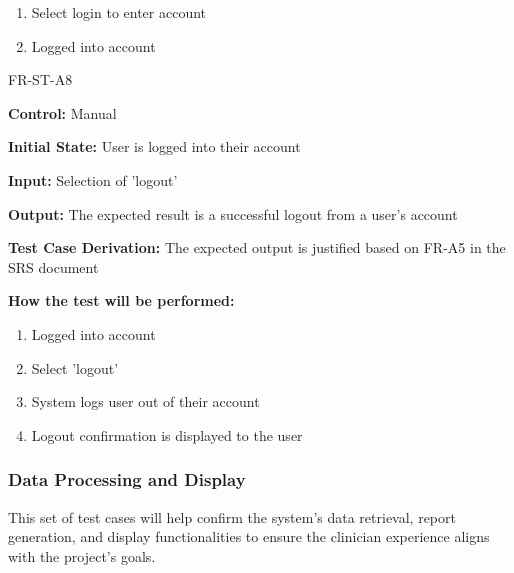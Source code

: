 \documentclass[12pt, titlepage]{article}
\begin{document}
\begin{itemize}
\begin{item}
\begin{mdframed}[linewidth=0.5mm]
\begin{enumerate}[noitemsep]
      \item Select login to enter account
      \item Logged into account
    \end{enumerate}
\end{mdframed}
\end{item}
\begin{item}
  FR-ST-A8
  \begin{mdframed}[linewidth=0.5mm]
    \textbf{Control:} Manual \par
    \textbf{Initial State:} User is logged into their account \par
    \textbf{Input:} Selection of 'logout' \par
    \textbf{Output:} The expected result is a successful logout from a user's account \par
    \textbf{Test Case Derivation:} The expected output is justified based on FR-A5 in the SRS document \par
    \textbf{How the test will be performed:}
    \begin{enumerate}[noitemsep]
      \item Logged into account
      \item Select 'logout'
      \item System logs user out of their account
      \item Logout confirmation is displayed to the user
    \end{enumerate}
\end{mdframed}
\end{item}
\end{itemize}

\subsubsection{Data Processing and Display}

\hspace{2em}This set of test cases will help confirm the system's data retrieval, report generation, 
and display functionalities to ensure the clinician experience aligns with the project’s goals.
\end{document}
